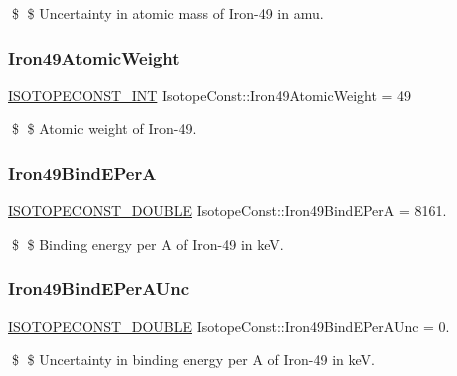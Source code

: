 \$ \$ Uncertainty in atomic mass of Iron-\/49 in amu. \mbox{\label{group___isotope_const-_iron-_fe49_ga43b7e435c8c1820656c130ff3759808c}} 
\subsubsection{\texorpdfstring{Iron49\+Atomic\+Weight}{Iron49AtomicWeight}}
{\footnotesize\ttfamily \mbox{\hyperlink{group___isotope_const-_macros_ga5f18360b3e99483a35c32d789e62621c}{I\+S\+O\+T\+O\+P\+E\+C\+O\+N\+S\+T\+\_\+\+I\+NT}} Isotope\+Const\+::\+Iron49\+Atomic\+Weight = 49}

\$ \$ Atomic weight of Iron-\/49. \mbox{\label{group___isotope_const-_iron-_fe49_gae2207adcca731ecf60dcbac955a1ff12}} 
\subsubsection{\texorpdfstring{Iron49\+Bind\+E\+PerA}{Iron49BindEPerA}}
{\footnotesize\ttfamily \mbox{\hyperlink{group___isotope_const-_macros_ga8f45a7272ce02c0b4c65c44636ed719a}{I\+S\+O\+T\+O\+P\+E\+C\+O\+N\+S\+T\+\_\+\+D\+O\+U\+B\+LE}} Isotope\+Const\+::\+Iron49\+Bind\+E\+PerA = 8161.}

\$ \$ Binding energy per A of Iron-\/49 in keV. \mbox{\label{group___isotope_const-_iron-_fe49_ga6de3b3578cb163bcfa0bc1f3925f4767}} 
\subsubsection{\texorpdfstring{Iron49\+Bind\+E\+Per\+A\+Unc}{Iron49BindEPerAUnc}}
{\footnotesize\ttfamily \mbox{\hyperlink{group___isotope_const-_macros_ga8f45a7272ce02c0b4c65c44636ed719a}{I\+S\+O\+T\+O\+P\+E\+C\+O\+N\+S\+T\+\_\+\+D\+O\+U\+B\+LE}} Isotope\+Const\+::\+Iron49\+Bind\+E\+Per\+A\+Unc = 0.}

\$ \$ Uncertainty in binding energy per A of Iron-\/49 in keV. \mbox{\label{group___isotope_const-_iron-_fe49_gaa926a2e2c8ab7373da13412c46ec771d}} 
